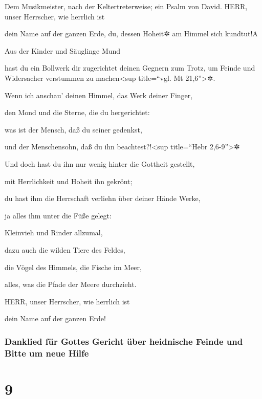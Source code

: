 Dem Musikmeister, nach der Keltertreterweise; ein Psalm
von David. HERR, unser Herrscher, wie herrlich ist

dein Name auf der ganzen Erde, du, dessen Hoheit✲ am Himmel sich
kundtut!{A}

Aus der Kinder und Säuglinge Mund

hast du ein Bollwerk dir zugerichtet deinen Gegnern zum Trotz, um Feinde
und Widersacher verstummen zu machen\textless sup title=``vgl. Mt
21,6''\textgreater✲.

Wenn ich anschau' deinen Himmel, das Werk deiner Finger,

den Mond und die Sterne, die du hergerichtet:

was ist der Mensch, daß du seiner gedenkst,

und der Menschensohn, daß du ihn beachtest?!\textless sup title=``Hebr
2,6-9''\textgreater✲

Und doch hast du ihn nur wenig hinter die Gottheit
gestellt,

mit Herrlichkeit und Hoheit ihn gekrönt;

du hast ihm die Herrschaft verliehn über deiner Hände
Werke,

ja alles ihm unter die Füße gelegt:

Kleinvieh und Rinder allzumal,

dazu auch die wilden Tiere des Feldes,

die Vögel des Himmels, die Fische im Meer,

alles, was die Pfade der Meere durchzieht.

HERR, unser Herrscher, wie herrlich ist

dein Name auf der ganzen Erde!

\hypertarget{danklied-fuxfcr-gottes-gericht-uxfcber-heidnische-feinde-und-bitte-um-neue-hilfe}{%
\subsubsection{Danklied für Gottes Gericht über heidnische Feinde und
Bitte um neue
Hilfe}\label{danklied-fuxfcr-gottes-gericht-uxfcber-heidnische-feinde-und-bitte-um-neue-hilfe}}

\hypertarget{section-8}{%
\section{9}\label{section-8}}

